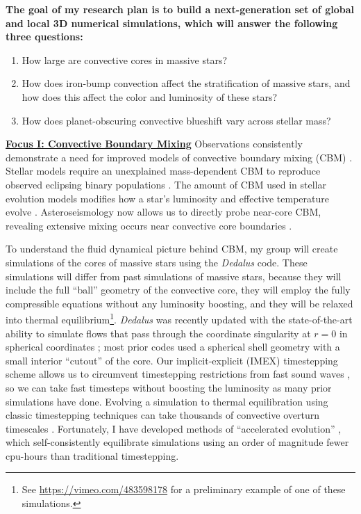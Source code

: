 \documentclass[12pt]{article}
\newcommand{\sct}[1]{\vspace{0.3cm}\hspace{-\parindent}\textbf{\underline{#1}}\hspace{0.3cm}}
\begin{document}
\textbf{The goal of my research plan is to build a next-generation set of global and local 3D numerical simulations, which will answer the following three questions:}\vspace{-0.2cm}
\begin{enumerate}
    \item How large are convective cores in massive stars? \vspace{-0.2cm}
    \item How does iron-bump convection affect the stratification of massive stars, and how does this affect the color and luminosity of these stars?\vspace{-0.2cm}
    \item How does planet-obscuring convective blueshift vary across stellar mass?\vspace{-0.2cm}
\end{enumerate}

\sct{Focus I: Convective Boundary Mixing}
Observations consistently demonstrate a need for improved models of convective boundary mixing (CBM) \citep{johnston2021}.
Stellar models require an unexplained mass-dependent CBM to reproduce observed eclipsing binary populations  \citep{claret_torres_2019}.
The amount of CBM used in stellar evolution models modifies how a star's luminosity and effective temperature evolve \citep{castro_etal_2014,higgins_vink_2019}.
Asteroseismology now allows us to directly probe near-core CBM, revealing extensive mixing occurs near convective core boundaries \citep{michielsen_etal_2019, pedersen_etal_2021}.

To understand the fluid dynamical picture behind CBM, my group will create simulations of the cores of massive stars using the \emph{Dedalus} \citep{burns_etal_2020} code.
These simulations will differ from past simulations of massive stars, because they will include the full ``ball'' geometry of the convective core, they will employ the fully compressible equations without any luminosity boosting, and they will be relaxed into thermal equilibrium\footnote{See \url{https://vimeo.com/483598178} for a preliminary example of one of these simulations.}.
\emph{Dedalus} was recently updated with the state-of-the-art ability to simulate flows that pass through the coordinate singularity at $r = 0$ in spherical coordinates \citep{vasil_etal_2019,lecoanet_etal_2019}; most prior codes used a spherical shell geometry with a small interior ``cutout'' of the core.
Our implicit-explicit (IMEX) timestepping scheme allows us to circumvent timestepping restrictions from fast sound waves \citep{anders_brown_2017}, so we can take fast timesteps without boosting the luminosity as many prior simulations have done.
Evolving a simulation to thermal equilibration using classic timestepping techniques can take thousands of convective overturn timescales \citep{anders_etal_2022a,anders_etal_2022b}.
Fortunately, I have developed methods of ``accelerated evolution'' \citep{anders_etal_2018}, which self-consistently equilibrate simulations using an order of magnitude fewer cpu-hours than traditional timestepping.
\end{document}
